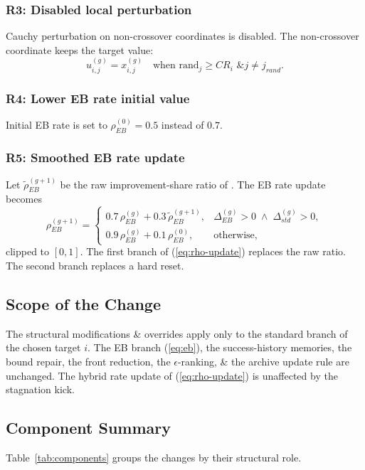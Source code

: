 \documentclass[conference]{IEEEtran}
\begin{document}
\subsubsection*{R3: Disabled local perturbation}
Cauchy perturbation on non-crossover coordinates is disabled. The non-crossover coordinate keeps the target value:
\begin{equation}
u_{i,j}^{(g)} = x_{i,j}^{(g)} \quad \text{when } \mathrm{rand}_j \ge CR_i \text{ \&} j \ne j_{rand}.
\label{eq:noperturb}
\end{equation}

\subsubsection*{R4: Lower EB rate initial value}
Initial EB rate is set to $\rho_{EB}^{(0)} = 0.5$ instead of $0.7$.

\subsubsection*{R5: Smoothed EB rate update}
Let $\tilde{\rho}^{(g+1)}_{EB}$ be the raw improvement-share ratio of \cite{tao2026rdex}. The EB rate update becomes
\begin{equation}
\rho_{EB}^{(g+1)} =
\begin{cases}
0.7\,\rho_{EB}^{(g)} + 0.3\,\tilde{\rho}^{(g+1)}_{EB}, & \Delta_{EB}^{(g)} \!>\! 0 \;\wedge\; \Delta_{std}^{(g)} \!>\! 0, \\
0.9\,\rho_{EB}^{(g)} + 0.1\,\rho_{EB}^{(0)}, & \text{otherwise},
\end{cases}
\label{eq:rho-update}
\end{equation}
clipped to $[0,1]$. The first branch of (\ref{eq:rho-update}) replaces the raw ratio. The second branch replaces a hard reset.

\subsection{Scope of the Change}
The structural modifications \& overrides apply only to the standard branch of the chosen target $i$. The EB branch (\ref{eq:eb}), the success-history memories, the bound repair, the front reduction, the $\epsilon$-ranking, \& the archive update rule are unchanged. The hybrid rate update of (\ref{eq:rho-update}) is unaffected by the stagnation kick.

\subsection{Component Summary}
Table~\ref{tab:components} groups the changes by their structural role.
\end{document}

